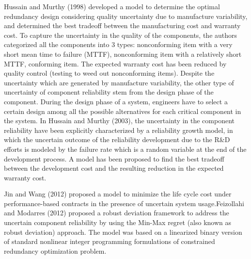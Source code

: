 \documentclass[preprint,12pt]{elsarticle}
\begin{document}
\begin{enumerate}
Hussain and Murthy (1998) developed a model to determine the optimal redundancy design considering quality uncertainty due to manufacture variability, and determined the best tradeoff between the manufacturing cost and warranty cost. To capture the uncertainty in the quality of the components, the authors categorized all the components into 3 types: nonconforming item with a very short mean time to failure (MTTF), nonconforming item with a relatively short MTTF, conforming item. The expected warranty cost has been reduced by quality control (testing to weed out nonconforming items). Despite the uncertainty which are generated by manufacture variability, the other type of uncertainty of component reliability stem from the design phase of the component. During the design phase of a system, engineers have to select a certain design among all the possible alternatives for each critical component in the system. In Hussain and Murthy (2003), the uncertainty in the component reliability have been explicitly characterized by a reliability growth model, in which the uncertain outcome of the reliability development due to the R\&D efforts is modeled by the failure rate which is a random variable at the end of the development process. A model has been proposed to find the best tradeoff between the development cost and the resulting reduction in the expected warranty cost.

 Jin and Wang (2012) proposed a model to minimize the life cycle cost under performance-based contracts in the presence of uncertain system usage.Feizollahi and Modarres (2012) proposed a robust deviation framework to address the uncertain component reliability by using the Min-Max regret (also known as robust deviation) approach. The model was based on a linearized binary version of standard nonlinear integer programming formulations of constrained redundancy optimization problem.

  \end{enumerate}
\end{document}
